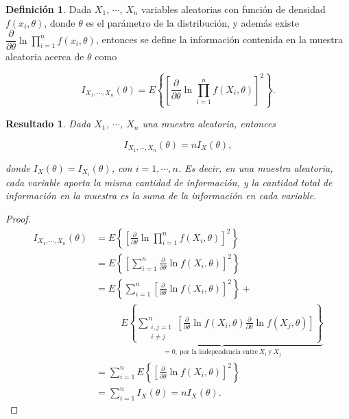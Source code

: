 \documentclass[
  10pt,
  spanish,
]{book}
\newtheorem{proposition}{Resultado}[chapter]
\theoremstyle{definition}
\newtheorem{definition}{Definición}[chapter]
\theoremstyle{definition}
\theoremstyle{definition}
\theoremstyle{definition}
\theoremstyle{remark}
\begin{document}
\begin{definition}
\protect\hypertarget{def:unnamed-chunk-3}{}{\label{def:unnamed-chunk-3} }Dada \(X_1\), \(\cdots\), \(X_n\) variables aleatorias con función de densidad \(f(x_i,\theta)\), donde \(\theta\) es el parámetro de la distribución, y además existe \(\dfrac{\partial}{\partial\theta}\ln{\prod_{i=1}^nf(x_i,\theta)}\), entonces se define la información contenida en la muestra aleatoria acerca de \(\theta\) como

\begin{equation}
I_{X_1,\cdots,X_n}(\theta)=E\left\{\left[\frac{\partial}{\partial\theta}\ln{\prod_{i=1}^nf(X_i,\theta)}\right]^2\right\}.
\end{equation}
\end{definition}

\begin{proposition}
\protect\hypertarget{prp:unnamed-chunk-4}{}{\label{prp:unnamed-chunk-4} }Dada \(X_1\), \(\cdots\), \(X_n\) una muestra aleatoria, entonces

\begin{equation*}
I_{X_1,\cdots,X_n}(\theta)=nI_X(\theta),
\end{equation*}

donde \(I_X(\theta)=I_{X_i}(\theta)\), con \(i=1,\cdots,n\). Es decir, en una muestra aleatoria, cada variable aporta la misma cantidad de información, y la cantidad total de información en la muestra es la suma de la información en cada variable.
\end{proposition}

\begin{proof}
{}\begin{align*}
I_{X_1,\cdots,X_n}(\theta)&=E\left\{\left[\frac{\partial}{\partial\theta}\ln{\prod_{i=1}^nf(X_i,\theta)}\right]^2\right\}\\                   &=E\left\{\left[\sum_{i=1}^n\frac{\partial}{\partial\theta}\ln{f(X_i,\theta)}\right]^2\right\}\\                       &=E\left\{\sum_{i=1}^n\left[\frac{\partial}{\partial\theta}\ln{f(X_i,\theta)}\right]^2\right\}+\\
                          &\ \ \ \ \ \ \ \ \ \ \ \ \underbrace{E\left\{\sum_{\substack{i,j=1\\i\neq j}}^n\left[\frac{\partial}{\partial\theta}\ln{f(X_i,\theta)}\frac{\partial}{\partial\theta}\ln{f(X_j,\theta)}\right]\right\}}_{=0,\ \text{por la independencia entre}\ X_i\ \text{y}\ X_j}\\                      &=\sum_{i=1}^nE\left\{\left[\frac{\partial}{\partial\theta}\ln{f(X_i,\theta)}\right]^2\right\}\\
                          &=\sum_{i=1}^nI_X(\theta)=nI_X(\theta).
\end{align*}
\end{proof}
\end{document}
